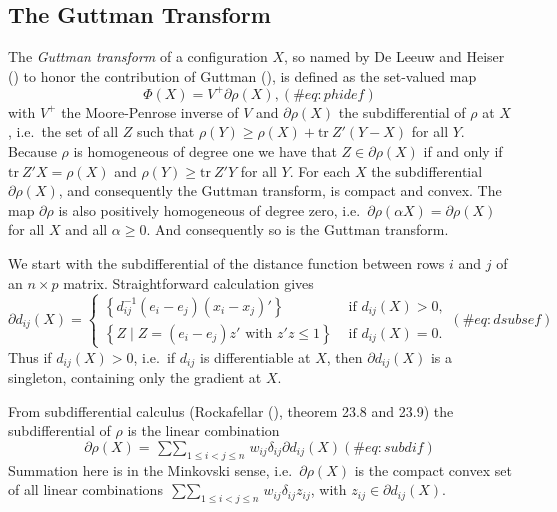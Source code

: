 \documentclass[
  12pt,
  letterpaper,
  DIV=11,
  numbers=noendperiod]{scrartcl}
\begin{document}
\subsection{The Guttman Transform}\label{the-guttman-transform}

The \emph{Guttman transform} of a configuration \(X\), so named by De
Leeuw and Heiser () to honor the
contribution of Guttman (), is defined as
the set-valued map \begin{equation}
\Phi(X)=V^+\partial\rho(X),
(\#eq:phidef)
\end{equation} with \(V^+\) the Moore-Penrose inverse of \(V\) and
\(\partial\rho(X)\) the subdifferential of \(\rho\) at \(X\), i.e.~the
set of all \(Z\) such that \(\rho(Y)\geq\rho(X)+\text{tr}\ Z'(Y-X)\) for
all \(Y\). Because \(\rho\) is homogeneous of degree one we have that
\(Z\in\partial\rho(X)\) if and only if \(\text{tr}\ Z'X=\rho(X)\) and
\(\rho(Y)\geq\text{tr}\ Z'Y\) for all \(Y\). For each \(X\) the
subdifferential \(\partial\rho(X)\), and consequently the Guttman
transform, is compact and convex. The map \(\partial\rho\) is also
positively homogeneous of degree zero,
i.e.~\(\partial\rho(\alpha X)=\partial\rho(X)\) for all \(X\) and all
\(\alpha\geq 0\). And consequently so is the Guttman transform.

We start with the subdifferential of the distance function between rows
\(i\) and \(j\) of an \(n\times p\) matrix. Straightforward calculation
gives \begin{equation}
\partial d_{ij}(X)=\begin{cases}
\left\{d_{ij}^{-1}(e_i-e_j)(x_i-x_j)'\right\}&\text{ if }d_{ij}(X)>0,\\
\left\{Z\mid Z=(e_i-e_j)z'\text{ with }z'z\leq1\right\}&\text{ if }d_{ij}(X)=0.
\end{cases}
(\#eq:dsubsef)
\end{equation} Thus if \(d_{ij}(X)>0\), i.e.~if \(d_{ij}\) is
differentiable at \(X\), then \(\partial d_{ij}(X)\) is a singleton,
containing only the gradient at \(X\).

From subdifferential calculus (Rockafellar
(), theorem 23.8 and 23.9) the
subdifferential of \(\rho\) is the linear combination \begin{equation}
\partial\rho(X)=\mathop{\sum\sum}_{1\leq i<j\leq n}w_{ij}\delta_{ij}\partial d_{ij}(X)
(\#eq:subdif)
\end{equation} Summation here is in the Minkovski sense,
i.e.~\(\partial\rho(X)\) is the compact convex set of all linear
combinations
\(\mathop{\sum\sum}_{1\leq i<j\leq n}w_{ij}\delta_{ij}z_{ij}\), with
\(z_{ij}\in\partial d_{ij}(X)\).
\end{document}
